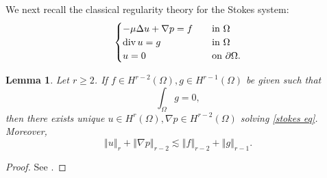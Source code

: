 \documentclass[a4paper,reqno,11pt]{amsart}
\newtheorem{lemma}[theorem]{Lemma}
\numberwithin{equation}{section}
\providecommand{\norm}[1]{\left\Vert#1\right\Vert}
\providecommand{\norm}[1]{\left\Vert#1\right\Vert}
\begin{document}
We next recall the classical regularity theory for the Stokes system:
\begin{equation}\label{stokes eq}
\begin{cases}
-\mu\Delta u +\nabla p =f  \quad &\hbox{in }\Omega
\\\operatorname{div}{u} =g  \quad  &\hbox{in }\Omega
\\u=0\quad &\hbox{on }{\partial} \Omega.
\end{cases}
\end{equation}
\begin{lemma}\label{i_linear_elliptic2}
Let $r\ge 2$. If $f\in H^{r-2}(\Omega),  g\in H^{r-1}(\Omega)$ be given such that
\begin{equation}
\int_\Omega g =0 ,
\end{equation}
then there exists unique $u\in H^r(\Omega),  \nabla p\in H^{r-2}(\Omega)$ solving \eqref{stokes eq}. Moreover,
\begin{equation}\label{stokes es}
\norm{u}_{r}+\norm{\nabla p}_{r-2}\lesssim\norm{f}_{r-2}+\norm{g}_{r-1}.
\end{equation}
\end{lemma}
\begin{proof}
 See \cite{L,T}.
\end{proof}
\end{document}
